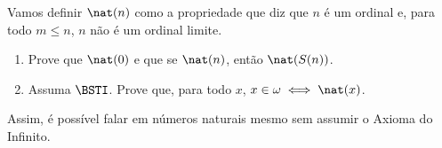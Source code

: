 \begin{exercise}[$\BST$]\label{exr:caracterizacaoDeNaturaisComoOrdinais}
    Vamos definir $\nat(n)$ como a propriedade que diz que $n$ é um ordinal e, para todo $m\leq n$, $n$ não é um ordinal limite.

    \begin{enumerate}[label=(\alph*)]
        \item Prove que $\nat(0)$ e que se $\nat(n)$, então $\nat(S(n))$.
        \item Assuma $\BSTI$.
        Prove que, para todo $x$, $x \in \omega \iff \nat(x)$.
    \end{enumerate}

    Assim, é possível falar em números naturais mesmo sem assumir o Axioma do Infinito.
\end{exercise}